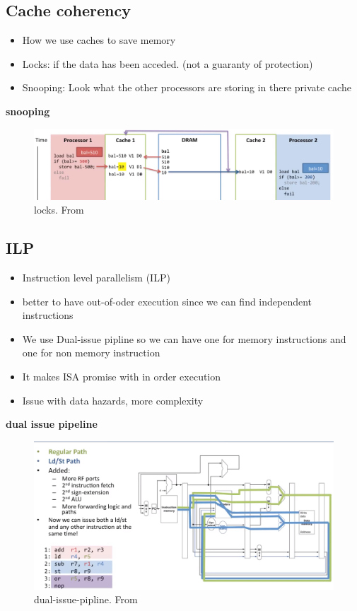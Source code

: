 \subsection{Cache coherency}
\begin{itemize}
\item  How we use caches to save memory
\item  Locks: if the data has been acceded. (not a guaranty of protection)
\item  Snooping: Look what the other processors are storing in there private cache   
\end{itemize}
  

\textbf{snooping}
\begin{figure}[H]
    \centering
    \includegraphics[width=16cm]{image/snooping.png}
    \caption{locks. From \cite{ca}}
\end{figure}

\subsection{ILP}
\begin{itemize}
\item  Instruction level parallelism (ILP)
\item  better to have out-of-oder execution since we can find independent instructions
\item  We use Dual-issue pipline so we can have one for memory instructions and
  one for non memory instruction
\item  It makes ISA promise with in order execution
\item  Issue with data hazards, more complexity
\end{itemize}


\textbf{dual issue pipeline}
\begin{figure}[H]
    \centering
    \includegraphics[width=16cm]{image/dual-issue-pipline.png}
    \caption{dual-issue-pipline. From \cite{ca}}
\end{figure}